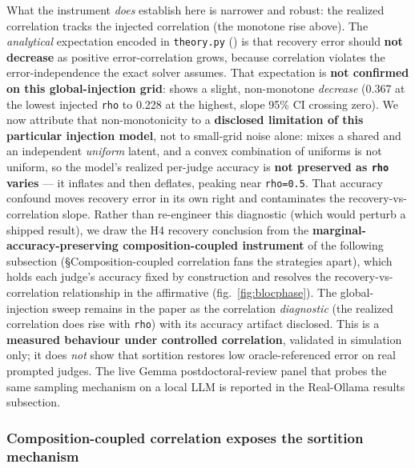 \documentclass[
]{article}
\begin{document}
What the instrument \emph{does} establish here is narrower and robust:
the realized correlation tracks the injected correlation (the monotone
rise above). The \emph{analytical} expectation encoded in
\texttt{theory.py} () is that
recovery error should \textbf{not decrease} as positive
error-correlation grows, because correlation violates the
error-independence the exact solver assumes. That expectation is
\textbf{not confirmed on this global-injection grid}:
 shows a slight, non-monotone
\emph{decrease} (0.367 at the lowest injected \texttt{rho} to 0.228 at
the highest, slope 95\% CI crossing zero). We now attribute that
non-monotonicity to a \textbf{disclosed limitation of this particular
injection model}, not to small-grid noise alone:
 mixes a shared and an
independent \emph{uniform} latent, and a convex combination of uniforms
is not uniform, so the model's realized per-judge accuracy is
\textbf{not preserved as \texttt{rho} varies} --- it inflates and then
deflates, peaking near \texttt{rho=0.5}. That accuracy confound moves
recovery error in its own right and contaminates the
recovery-vs-correlation slope. Rather than re-engineer this diagnostic
(which would perturb a shipped result), we draw the H4 recovery
conclusion from the \textbf{marginal-accuracy-preserving
composition-coupled instrument} of the following subsection
(§Composition-coupled correlation fans the strategies apart), which
holds each judge's accuracy fixed by construction and resolves the
recovery-vs-correlation relationship in the affirmative
(fig.~\ref{fig:blocphase}). The global-injection sweep remains in the
paper as the correlation \emph{diagnostic} (the realized correlation
does rise with \texttt{rho}) with its accuracy artifact disclosed. This
is a \textbf{measured behaviour under controlled correlation}, validated
in simulation only; it does \emph{not} show that sortition restores low
oracle-referenced error on real prompted judges. The live Gemma
postdoctoral-review panel that probes the same sampling mechanism on a
local LLM is reported in the Real-Ollama results subsection.

\subsubsection{Composition-coupled correlation exposes the sortition
mechanism}\label{composition-coupled-correlation-exposes-the-sortition-mechanism}
\end{document}
